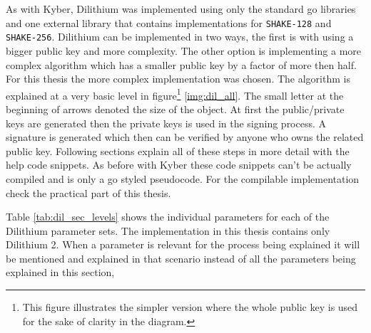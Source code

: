 As with Kyber, Dilithium was implemented using only the standard go libraries and one external library \cite{00fV2cvg7Z6H2tS3} that contains implementations for \texttt{SHAKE-128} and \texttt{SHAKE-256}. Dilithium can be implemented in two ways, the first is with using a bigger public key and more complexity. The other option is implementing a more complex algorithm which has a smaller public key by a factor of more then half. For this thesis the more complex implementation was chosen. The algorithm is explained at a very basic level in figure\footnote{This figure illustrates the simpler version where the whole public key is used for the sake of clarity in the diagram.} \ref{img:dil_all}. The small letter at the beginning of arrows denoted the size of the object. At first the public/private keys are generated then the private keys is used in the signing process. A signature is generated which then can be verified by anyone who owns the related public key. Following sections explain all of these steps in more detail with the help code snippets. As before with Kyber these code snippets can't be actually compiled and is only a go styled pseudocode. For the compilable implementation check the practical part of this thesis.

Table \ref{tab:dil_sec_levels} shows the individual parameters for each of the Dilithium parameter sets. The implementation in this thesis contains only Dilithium 2. When a parameter is relevant for the process being explained it will be mentioned and explained in that scenario instead of all the parameters being explained in this section,

